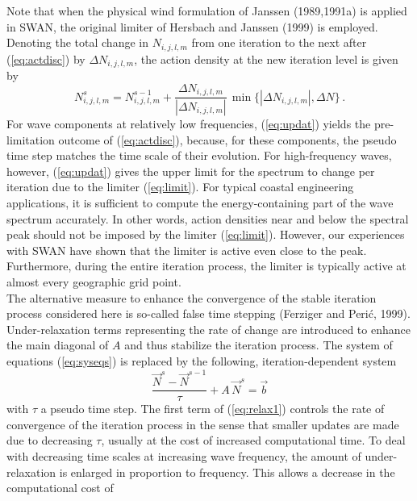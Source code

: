 \documentclass[12pt]{book}
\begin{document}
Note that when the physical wind formulation of Janssen (1989,1991a) is applied in SWAN, the original
limiter of Hersbach and Janssen (1999) is employed. Denoting the
total change in $N_{i,j,l,m}$ from one iteration to the next after (\ref{eq:actdisc}) by
$\Delta N_{i,j,l,m}$, the action density at the new iteration level is given by
\begin{equation}
  N_{i,j,l,m}^s = N_{i,j,l,m}^{s-1} + \frac{\Delta N_{i,j,l,m}}{|\Delta N_{i,j,l,m}|} \,
  \min \{ | \Delta N_{i,j,l,m} |, \Delta N \} \, .
  \label{eq:updat}
\end{equation}
For wave components at relatively low frequencies, (\ref{eq:updat}) yields
the pre-limitation outcome of (\ref{eq:actdisc}), because, for these
components, the pseudo time step matches the time scale of their evolution. For
high-frequency waves, however, (\ref{eq:updat}) gives the upper limit for the
spectrum to change per iteration due to the limiter (\ref{eq:limit}).
For typical coastal engineering applications, it is sufficient to
compute the energy-containing part of the wave spectrum accurately.
In other words, action densities near and below the spectral peak should not be imposed
by the limiter (\ref{eq:limit}). However, our experiences with
SWAN have shown that the limiter is active even close to the peak. Furthermore,
during the entire iteration process, the limiter is typically active at
almost every geographic grid point.
\nocite{Her99J,Boo99RH,Kom94CDHHJ,Tol92a}
\\[2ex]
\noindent
The alternative measure to enhance the convergence of the stable iteration process considered here
is so-called false time stepping (Ferziger and Peri\'{c}, 1999).
Under-relaxation terms representing the rate of change are introduced to enhance the main
diagonal of $A$ and thus stabilize the iteration process. The system of equations
(\ref{eq:syseqs}) is replaced by the following, iteration-dependent system
\begin{equation}
  \frac{{\vec{N}}^s - {\vec{N}}^{s-1}}{\tau} + A\,{\vec{N}}^s = \vec{b}
  \label{eq:relax1}
\end{equation}
with $\tau$ a pseudo time step.
The first term of (\ref{eq:relax1}) controls the rate of
convergence of the iteration process in the sense that
smaller updates are made due to decreasing $\tau$, usually
at the cost of increased computational time.
To deal with decreasing time scales at
increasing wave frequency, the amount of under-relaxation is enlarged in
proportion to frequency. This allows a decrease in the computational cost of
\end{document}
